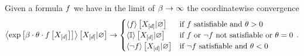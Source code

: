 \begin{lemma}
    \label{lem:localHardLimit}
    Given a formula $f$ we have in the limit of $\beta\rightarrow\infty$ the coordinatewise convergence
    \begin{align*}
        \left\langle \mathrm{exp}\left[\beta\cdot\theta\cdot f\left[X_{[d]}\right]\right]\right\rangle \left[ X_{[d]} | \varnothing \right] \rightarrow
        \begin{cases}
            \left\langle f\right\rangle \left[ X_{[d]} | \varnothing \right] & \text{if $f$ satisfiable and } \theta>0\\
            \left\langle \mathbb{I}\right\rangle \left[ X_{[d]} | \varnothing \right] & \text{if $f$ or $\lnot f$ not satisfiable or } \theta=0 \\
            \left\langle \lnot f\right\rangle \left[ X_{[d]} | \varnothing \right] & \text{if $\lnot f$ satisfiable and } \theta<0\\
        \end{cases} \, .
    \end{align*}
\end{lemma}
